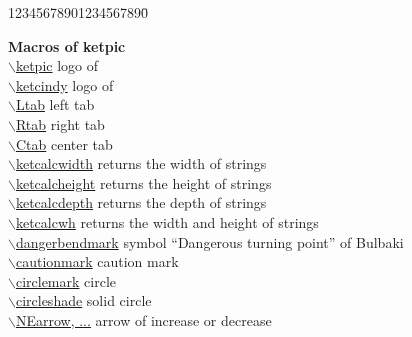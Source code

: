 \documentclass[papersize,a4paper,12pt]{article}
\newcommand{\bs}{$\backslash$}
\begin{document}
\begin{tabbing}
12345678901234567890\=\kill

{\bf Macros of ketpic} \> \\
\hyperlink{ketpic}{\bs ketpic} \> logo of \ketpic\\
\hyperlink{ketcindy}{\bs ketcindy} \> logo of \ketcindy\\
\hyperlink{tab}{\bs Ltab} \> left tab\\
\hyperlink{tab}{\bs Rtab} \> right tab\\
\hyperlink{tab}{\bs Ctab} \> center tab\\
\hyperlink{ketcalc}{\bs ketcalcwidth} \> returns the width of strings\\
\hyperlink{ketcalc}{\bs ketcalcheight} \> returns the height of strings\\
\hyperlink{ketcalc}{\bs ketcalcdepth} \> returns the depth of strings\\
\hyperlink{ketcalcwh}{\bs ketcalcwh} \> returns the width and height of strings\\
\hyperlink{dangerbendmark}{\bs dangerbendmark} \> symbol ``Dangerous turning point'' of Bulbaki\\
\hyperlink{cautionmark}{\bs cautionmark} \> caution mark\\
\hyperlink{circlemark}{\bs circlemark} \> circle\\
\hyperlink{circleshade}{\bs circleshade} \> solid circle\\
\hyperlink{arrow of i or d}{\bs NEarrow, ...} \> arrow of increase or decrease\\


\end{tabbing}
\end{document}
